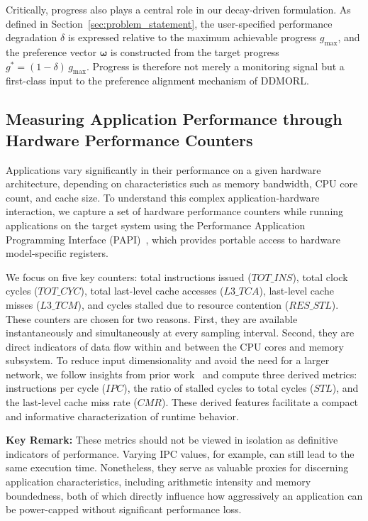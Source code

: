 Critically, progress also plays a central role in our 
decay-driven formulation. As defined in 
Section~\ref{sec:problem_statement}, the user-specified 
performance degradation $\delta$ is expressed relative to the 
maximum achievable progress $g_{\max}$, and the preference 
vector $\boldsymbol{\omega}$ is constructed from the 
target progress $g^* = (1-\delta)\,g_{\max}$. Progress is 
therefore not merely a monitoring signal but a first-class 
input to the preference alignment mechanism of DDMORL.

\subsection{Measuring Application Performance through Hardware 
Performance Counters}
\label{subsec:Applications_vs_perf}

Applications vary significantly in their performance on a given 
hardware architecture, depending on characteristics such as 
memory bandwidth, CPU core count, and cache size. To understand 
this complex application-hardware interaction, we capture a set 
of hardware performance counters while running applications on 
the target system using the Performance Application Programming 
Interface (PAPI)~\cite{mucci1999papi}, which provides portable 
access to hardware model-specific registers.

We focus on five key counters: total instructions issued 
($TOT\_INS$), total clock cycles ($TOT\_CYC$), total last-level 
cache accesses ($L3\_TCA$), last-level cache misses ($L3\_TCM$), 
and cycles stalled due to resource contention ($RES\_STL$). 
These counters are chosen for two reasons. First, they are 
available instantaneously and simultaneously at every sampling 
interval. Second, they are direct indicators of data flow within 
and between the CPU cores and memory subsystem. To reduce input 
dimensionality and avoid the need for a larger network, we 
follow insights from prior 
work~\cite{wittmann2016chip,rane2014enhancing} and compute 
three derived metrics: instructions per cycle ($IPC$), the 
ratio of stalled cycles to total cycles ($STL$), and the 
last-level cache miss rate ($CMR$). These derived features 
facilitate a compact and informative characterization of runtime 
behavior.

\textbf{Key Remark:} These metrics should not be viewed in 
isolation as definitive indicators of performance. Varying IPC 
values, for example, can still lead to the same execution time. 
Nonetheless, they serve as valuable proxies for discerning 
application characteristics, including arithmetic intensity and 
memory boundedness, both of which directly influence how 
aggressively an application can be power-capped without 
significant performance loss.

